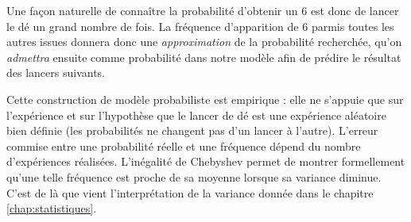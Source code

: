 Une façon naturelle de connaître la probabilité d'obtenir un $6$ est donc de lancer le dé un grand nombre de fois.
La fréquence d'apparition de $6$ parmis toutes les autres issues donnera donc une \emph{approximation} de la probabilité recherchée, qu'on \emph{admettra} ensuite comme probabilité dans notre modèle afin de prédire le résultat des lancers suivants.

Cette construction de modèle probabiliste est empirique : elle ne s'appuie que sur l'expérience et sur l'hypothèse que le lancer de dé est une expérience aléatoire bien définie (les probabilités ne changent pas d'un lancer à l'autre).
L'erreur commise entre une probabilité réelle et une fréquence dépend du nombre d'expériences réalisées.
L'inégalité de Chebyshev permet de montrer formellement qu'une telle fréquence est proche de sa moyenne lorsque sa variance diminue.
C'est de là que vient l'interprétation de la variance donnée dans le chapitre \ref{chap:statistiques}.



